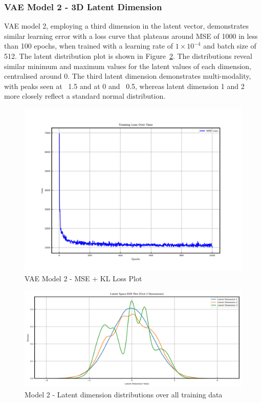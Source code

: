 \documentclass{article}
\begin{document}
\subsubsection{VAE Model 2 - 3D Latent Dimension}
VAE model 2, employing a third dimension in the latent vector, demonstrates similar learning error with a loss curve that plateaus around MSE of 1000 in less than 100 epochs, when trained with a learning rate of $1\times10^{-4}$ and batch size of 512. The latent distribution plot is shown in Figure~\ref{fig:model2_latent_dist}. The distributions reveal similar minimum and maximum values for the latent values of each dimension, centralised around 0. The third latent dimension demonstrates multi-modality, with peaks seen at ~1.5 and at 0 and ~0.5, whereas latent dimension 1 and 2 more closely reflect a standard normal distribution.


\begin{figure}[H]
\centering
    \includegraphics[width=0.75\linewidth]{figures/VAEmodels/model2/loss_plot.png}
    \caption{VAE Model 2 - MSE + KL Loss Plot}
    \label{fig:model2_loss_plot}
\end{figure}

\begin{figure}[H]
    \centering
    \includegraphics[width=0.75\linewidth]{figures/VAEmodels/model2/latent_distribution.png}
    \caption{Model 2 - Latent dimension distributions over all training data}
    \label{fig:model2_latent_dist}
\end{figure}
\end{document}
